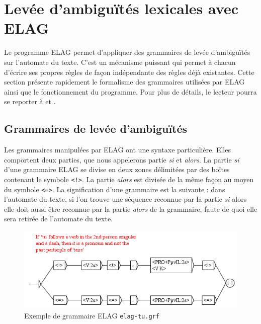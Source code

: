 
\section{Levée d’ambiguïtés lexicales avec ELAG}
Le programme ELAG permet d’appliquer des grammaires de levée d’ambiguïtés sur
l’automate du texte. C’est un mécanisme puissant qui permet à chacun d’écrire ses propres
règles de façon indépendante des règles déjà existantes. Cette section présente rapidement le
formalisme des grammaires utilisées par ELAG ainsi que le fonctionnement du programme.
Pour plus de détails, le lecteur pourra se reporter à \cite{elag-blanc-dister} et \cite{ELAG}.


\subsection{Grammaires de levée d’ambiguïtés}
\label{section-elag-grammars}
Les grammaires manipulées par ELAG ont une syntaxe particulière. Elles comportent deux parties, que
nous appelerons partie \textit{si} et \textit{alors}. La partie \textit{si} d’une grammaire
ELAG se divise en deux zones délimitées par des boîtes contenant le symbole \verb+<!>+. 
La partie \textit{alors} est divisée de la même façon au moyen du symbole \verb+<=>+.                                                                 La signification d’une grammaire est la suivante : dans l’automate du texte, si l’on trouve une
séquence reconnue par la partie \textit{si} alors elle doit aussi être reconnue par la partie
\textit{alors} de la grammaire, faute de quoi elle sera retirée de l’automate du texte.


\begin{figure}[!ht]
\begin{center}
\includegraphics[width=13.1cm]{resources/img/fig7-12.png}
\caption{Exemple de grammaire ELAG \texttt{elag-tu.grf}\label{fig-elag-tu}}
\end{center}
\end{figure}

